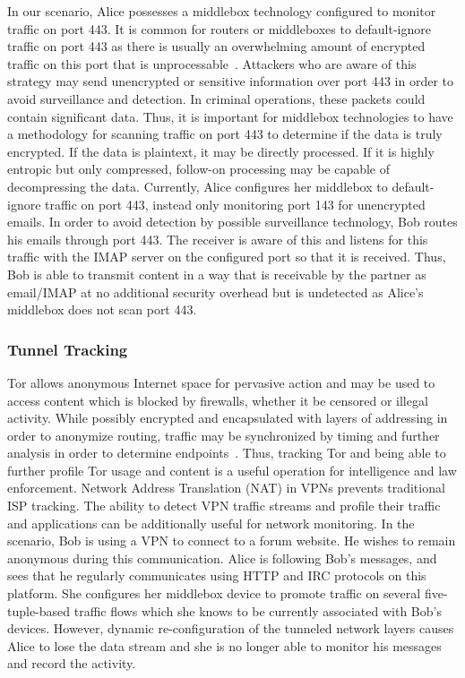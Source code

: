 In our scenario, Alice possesses a middlebox technology configured to monitor traffic on port 443. It is common for routers or middleboxes to default-ignore traffic on port 443 as there is usually an overwhelming amount of encrypted traffic on this port that is unprocessable~\cite{shane-review-dns-over-http-04}. Attackers who are aware of this strategy may send unencrypted or sensitive information over port 443 in order to avoid surveillance and detection. In criminal operations, these packets could contain significant data. Thus, it is important for middlebox technologies to have a methodology for scanning traffic on port 443 to determine if the data is truly encrypted. If the data is plaintext, it may be directly processed. If it is highly entropic but only compressed, follow-on processing may be capable of decompressing the data. Currently, Alice configures her middlebox to default-ignore traffic on port 443, instead only monitoring port 143 for unencrypted emails. In order to avoid detection by possible surveillance technology, Bob routes his emails through port 443. The receiver is aware of this and listens for this traffic with the IMAP server on the configured port so that it is received. Thus, Bob is able to transmit content in a way that is receivable by the partner as email/IMAP at no additional security overhead but is undetected as Alice's middlebox does not scan port 443.

\subsubsection{Tunnel Tracking}
Tor allows anonymous Internet space for pervasive action and may be used to access content which is blocked by firewalls, whether it be censored or illegal activity. While possibly encrypted and encapsulated with layers of addressing in order to anonymize routing, traffic may be synchronized by timing and further analysis in order to determine endpoints~\cite{Simioni2021}. Thus, tracking Tor and being able to further profile Tor usage and content is a useful operation for intelligence and law enforcement. Network Address Translation (NAT) in VPNs prevents traditional ISP tracking. The ability to detect VPN traffic streams and profile their traffic and applications can be additionally useful for network monitoring. In the scenario, Bob is using a VPN to connect to a forum website. He wishes to remain anonymous during this communication. Alice is following Bob's messages, and sees that he regularly communicates using HTTP and IRC protocols on this platform. She configures her middlebox device to promote traffic on several five-tuple-based traffic flows which she knows to be currently associated with Bob's devices. However, dynamic re-configuration of the tunneled network layers causes Alice to lose the data stream and she is no longer able to monitor his messages and record the activity.

